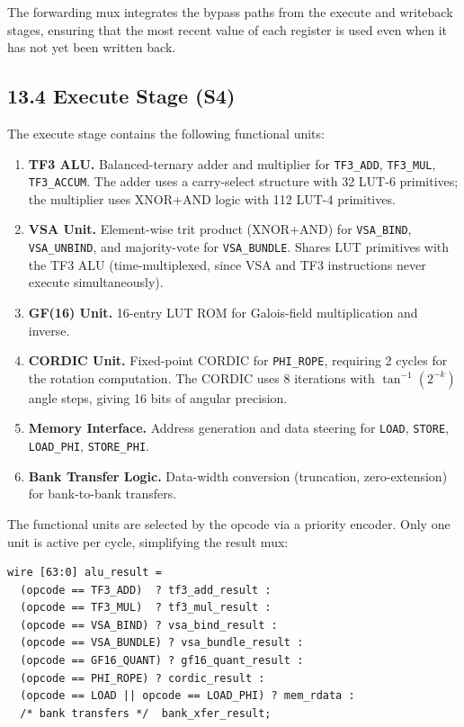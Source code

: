 The forwarding mux integrates the bypass paths from the execute
and writeback stages, ensuring that the most recent value of each
register is used even when it has not yet been written back.

\subsection{13.4 Execute Stage (S4)}\label{fa_71:execute}

The execute stage contains the following functional units:

\begin{enumerate}
\def\labelenumi{\arabic{enumi}.}
\item
  \textbf{TF3 ALU.} Balanced-ternary adder and multiplier for
  \texttt{TF3\_ADD}, \texttt{TF3\_MUL}, \texttt{TF3\_ACCUM}.
  The adder uses a carry-select structure with 32 LUT-6
  primitives; the multiplier uses XNOR+AND logic with 112 LUT-4
  primitives.
\item
  \textbf{VSA Unit.} Element-wise trit product (XNOR+AND) for
  \texttt{VSA\_BIND}, \texttt{VSA\_UNBIND}, and majority-vote
  for \texttt{VSA\_BUNDLE}. Shares LUT primitives with the TF3
  ALU (time-multiplexed, since VSA and TF3 instructions never
  execute simultaneously).
\item
  \textbf{GF(16) Unit.} 16-entry LUT ROM for Galois-field
  multiplication and inverse.
\item
  \textbf{CORDIC Unit.} Fixed-point CORDIC for \texttt{PHI\_ROPE},
  requiring 2 cycles for the rotation computation. The CORDIC
  uses 8 iterations with $\tan^{-1}(2^{-k})$ angle steps, giving
  16 bits of angular precision.
\item
  \textbf{Memory Interface.} Address generation and data steering
  for \texttt{LOAD}, \texttt{STORE}, \texttt{LOAD\_PHI},
  \texttt{STORE\_PHI}.
\item
  \textbf{Bank Transfer Logic.} Data-width conversion (truncation,
  zero-extension) for bank-to-bank transfers.
\end{enumerate}

The functional units are selected by the opcode via a priority
encoder. Only one unit is active per cycle, simplifying the
result mux:

\begin{verbatim}
wire [63:0] alu_result =
  (opcode == TF3_ADD)  ? tf3_add_result :
  (opcode == TF3_MUL)  ? tf3_mul_result :
  (opcode == VSA_BIND) ? vsa_bind_result :
  (opcode == VSA_BUNDLE) ? vsa_bundle_result :
  (opcode == GF16_QUANT) ? gf16_quant_result :
  (opcode == PHI_ROPE) ? cordic_result :
  (opcode == LOAD || opcode == LOAD_PHI) ? mem_rdata :
  /* bank transfers */  bank_xfer_result;
\end{verbatim}

